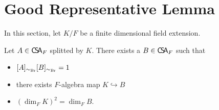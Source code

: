  \section{Good Representative Lemma}
 In this section, let $K/F$ be a finite dimensional field extension.

 \begin{lemma}
   \label{lem:good-rep-inv}
   Let $A\in\operatorname{\mathsf{C}\!\mathsf{S}\!\mathsf{A}}_{F}$ splitted by $K$. There exists a $B\in\operatorname{\mathsf{C}\!\mathsf{S}\!\mathsf{A}}_{F}$ such that
   \begin{itemize}
     \item $[A]_{\sim_{\operatorname{Br}}}[B]_{\sim_{\operatorname{Br}}}=1$
     \item there exists $F$-algebra map $K\hookrightarrow B$
     \item ${\left(\dim_{F}K\right)}^{2}=\dim_{F}B$.
   \end{itemize}
   \leanok
 \end{lemma}
